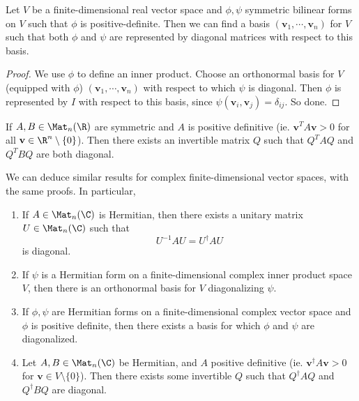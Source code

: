 \documentclass[a4paper]{article}
\begin{document}
\begin{cor}
  Let $V$ be a finite-dimensional real vector space and $\phi, \psi$ symmetric bilinear forms on $V$ such that $\phi$ is positive-definite. Then we can find a basis $(\mathbf{v}_1, \cdots, \mathbf{v}_n)$ for $V$ such that both $\phi$ and $\psi$ are represented by diagonal matrices with respect to this basis.
\end{cor}

\begin{proof}
  We use $\phi$ to define an inner product. Choose an orthonormal basis for $V$ (equipped with $\phi$) $(\mathbf{v}_1, \cdots, \mathbf{v}_n)$ with respect to which $\psi$ is diagonal. Then $\phi$ is represented by $I$ with respect to this basis, since $\psi(\mathbf{v}_i, \mathbf{v}_j) = \delta_{ij}$. So done.
\end{proof}

\begin{cor}
  If $A, B \in \Mat_n(\R)$ are symmetric and $A$ is positive definitive (ie. $\mathbf{v}^T A \mathbf{v} > 0$ for all $\mathbf{v} \in \R^n \setminus \{0\}$). Then there exists an invertible matrix $Q$ such that $Q^T AQ$ and $Q^T BQ$ are both diagonal.
\end{cor}

We can deduce similar results for complex finite-dimensional vector spaces, with the same proofs. In particular,
\begin{prop}\leavevmode
  \begin{enumerate}
    \item If $A \in \Mat_n(\C)$ is Hermitian, then there exists a unitary matrix $U \in \Mat_n(\C)$ such that
      \[
        U^{-1}AU = U^\dagger AU
      \]
      is diagonal.
    \item If $\psi$ is a Hermitian form on a finite-dimensional complex inner product space $V$, then there is an orthonormal basis for $V$ diagonalizing $\psi$.
    \item If $\phi, \psi$ are Hermitian forms on a finite-dimensional complex vector space and $\phi$ is positive definite, then there exists a basis for which $\phi$ and $\psi$ are diagonalized.
    \item Let $A, B \in \Mat_n(\C)$ be Hermitian, and $A$ positive definitive (ie. $\mathbf{v}^\dagger A \mathbf{v} > 0$ for $\mathbf{v} \in V \setminus \{0\}$). Then there exists some invertible $Q$ such that $Q^\dagger AQ$ and $Q^\dagger BQ$ are diagonal.
  \end{enumerate}
\end{prop}
\end{document}
